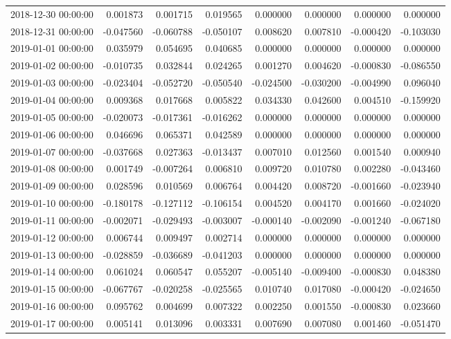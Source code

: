 \begin{tabular}{lrrrrrrr}
2018-12-30 00:00:00 & 0.001873 & 0.001715 & 0.019565 & 0.000000 & 0.000000 & 0.000000 & 0.000000 \\
2018-12-31 00:00:00 & -0.047560 & -0.060788 & -0.050107 & 0.008620 & 0.007810 & -0.000420 & -0.103030 \\
2019-01-01 00:00:00 & 0.035979 & 0.054695 & 0.040685 & 0.000000 & 0.000000 & 0.000000 & 0.000000 \\
2019-01-02 00:00:00 & -0.010735 & 0.032844 & 0.024265 & 0.001270 & 0.004620 & -0.000830 & -0.086550 \\
2019-01-03 00:00:00 & -0.023404 & -0.052720 & -0.050540 & -0.024500 & -0.030200 & -0.004990 & 0.096040 \\
2019-01-04 00:00:00 & 0.009368 & 0.017668 & 0.005822 & 0.034330 & 0.042600 & 0.004510 & -0.159920 \\
2019-01-05 00:00:00 & -0.020073 & -0.017361 & -0.016262 & 0.000000 & 0.000000 & 0.000000 & 0.000000 \\
2019-01-06 00:00:00 & 0.046696 & 0.065371 & 0.042589 & 0.000000 & 0.000000 & 0.000000 & 0.000000 \\
2019-01-07 00:00:00 & -0.037668 & 0.027363 & -0.013437 & 0.007010 & 0.012560 & 0.001540 & 0.000940 \\
2019-01-08 00:00:00 & 0.001749 & -0.007264 & 0.006810 & 0.009720 & 0.010780 & 0.002280 & -0.043460 \\
2019-01-09 00:00:00 & 0.028596 & 0.010569 & 0.006764 & 0.004420 & 0.008720 & -0.001660 & -0.023940 \\
2019-01-10 00:00:00 & -0.180178 & -0.127112 & -0.106154 & 0.004520 & 0.004170 & 0.001660 & -0.024020 \\
2019-01-11 00:00:00 & -0.002071 & -0.029493 & -0.003007 & -0.000140 & -0.002090 & -0.001240 & -0.067180 \\
2019-01-12 00:00:00 & 0.006744 & 0.009497 & 0.002714 & 0.000000 & 0.000000 & 0.000000 & 0.000000 \\
2019-01-13 00:00:00 & -0.028859 & -0.036689 & -0.041203 & 0.000000 & 0.000000 & 0.000000 & 0.000000 \\
2019-01-14 00:00:00 & 0.061024 & 0.060547 & 0.055207 & -0.005140 & -0.009400 & -0.000830 & 0.048380 \\
2019-01-15 00:00:00 & -0.067767 & -0.020258 & -0.025565 & 0.010740 & 0.017080 & -0.000420 & -0.024650 \\
2019-01-16 00:00:00 & 0.095762 & 0.004699 & 0.007322 & 0.002250 & 0.001550 & -0.000830 & 0.023660 \\
2019-01-17 00:00:00 & 0.005141 & 0.013096 & 0.003331 & 0.007690 & 0.007080 & 0.001460 & -0.051470 \\

\end{tabular}
